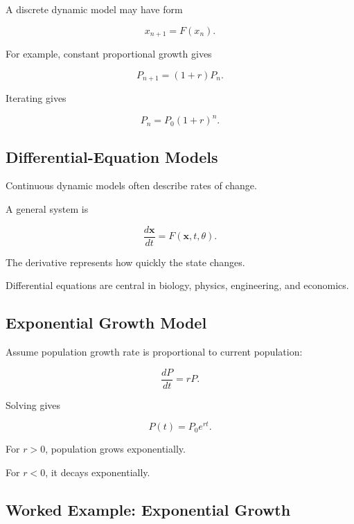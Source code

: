 A discrete dynamic model may have form

\[
\boxed{
x_{n+1}=F(x_n).
}
\]

For example, constant proportional growth gives

\[
\boxed{
P_{n+1}
=
(1+r)P_n.
}
\]

Iterating gives

\[
\boxed{
P_n
=
P_0(1+r)^n.
}
\]

\subsection{Differential-Equation Models}
\label{subsec:differential-equation-models}

Continuous dynamic models often describe rates of change.

A general system is

\[
\boxed{
\frac{d\mathbf{x}}{dt}
=
F(\mathbf{x},t,\theta).
}
\]

The derivative represents how quickly the state changes.

Differential equations are central in biology, physics, engineering, and
economics.

\subsection{Exponential Growth Model}
\label{subsec:exponential-growth-modeling}

Assume population growth rate is proportional to current population:

\[
\boxed{
\frac{dP}{dt}=rP.
}
\]

Solving gives

\[
\boxed{
P(t)=P_0e^{rt}.
}
\]

For \(r>0\), population grows exponentially.

For \(r<0\), it decays exponentially.

\subsection{Worked Example: Exponential Growth}
\label{subsec:worked-exponential-growth-model}

